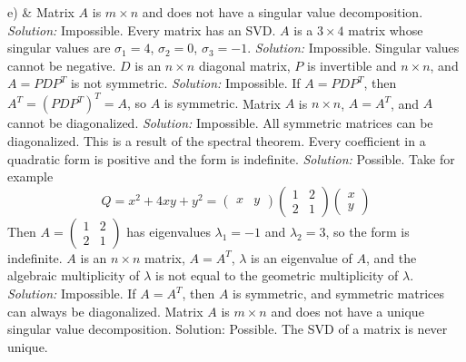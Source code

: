 e) &  
\ifnum {}         
    Matrix $A$ is $m\times n$ and does not have a singular value decomposition. 
    \ifnum {} {\color{DarkBlue} \textit{Solution:  } Impossible. Every matrix has an SVD. } \fi
\fi
\ifnum {}      
   $A$ is a $3\times4$ matrix whose singular values are $\sigma_1=4$, $\sigma_2=0$, $\sigma_3=-1$. 
    \ifnum {} {\color{DarkBlue} \textit{Solution:  } Impossible. Singular values cannot be negative. } \fi
\fi    
\ifnum {}  
    $ D $ is an $n\times n$ diagonal matrix, $P$ is invertible and $n\times n$, and $A= P D P ^{T}$ is not symmetric.  
    \ifnum {} {\color{DarkBlue} \textit{Solution:  } Impossible. If $A= P D P ^{T}$, then $A^T = (P D P ^{T})^T = A$, so $A$ is symmetric. } \fi
\fi    
\ifnum {}    
     Matrix $A$ is $n\times n$, $A=A^T$, and $A$ cannot be diagonalized. 
    \ifnum {} {\color{DarkBlue} \textit{Solution:  } Impossible. All symmetric matrices can be diagonalized. This is a result of the spectral theorem.} \fi
\fi   
\ifnum {}    
    Every coefficient in a quadratic form is positive and the form is indefinite.  
    \ifnum {} {\color{DarkBlue} \textit{Solution:  } Possible. Take for example \setlength{\extrarowheight}{0.0cm}
    $$Q = x^2 + 4xy + y^2 = \begin{pmatrix} x & y\end{pmatrix}\begin{pmatrix} 1&2\\2&1\end{pmatrix}\begin{pmatrix} x\\y\end{pmatrix}$$ Then $A = \begin{pmatrix} 1&2\\2&1\end{pmatrix}$ has eigenvalues $\lambda_1 = -1$ and $\lambda_2=3$, so the form is indefinite. } \fi
\fi    
\ifnum {}      
    $A$ is an $n\times n$ matrix, $A=A^T$, $\lambda$ is an eigenvalue of $A$, and the algebraic multiplicity of $\lambda$ is not equal to the geometric multiplicity of $\lambda$. 
    \ifnum {} {\color{DarkBlue} \textit{Solution:  } Impossible. If $A=A^T$, then $A$ is symmetric, and symmetric matrices can always be diagonalized.  } \fi
\fi        
\ifnum {}  
    Matrix $A$ is $m\times n$ and does not have a unique singular value decomposition. 
    \ifnum {} {\color{DarkBlue} Solution: Possible. The SVD of a matrix is never unique. }  \fi
